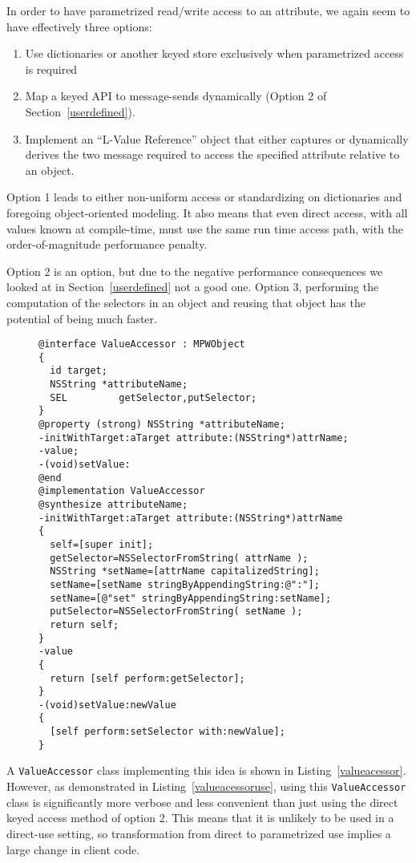 \documentclass[preprint]{sigplanconf}
\begin{document}
In order to have parametrized read/write access to an attribute, we again seem to have effectively
three options:

\begin{enumerate}
\item Use dictionaries or another keyed store exclusively when parametrized access is required
\item Map a keyed API to message-sends dynamically (Option 2 of Section~\ref{userdefined}).
\item Implement an ``L-Value Reference'' object that either captures or dynamically derives 
	the two message required to access the specified attribute relative to an object.
\end{enumerate}


Option 1 leads to either non-uniform access or standardizing on dictionaries and foregoing 
object-oriented modeling.   It also means that even direct access, with all values known
at compile-time, must use the same run time access path, with the order-of-magnitude
performance penalty.
 
Option 2 is an option, but due to the negative performance
consequences we looked at in
Section~\ref{userdefined} not a good one.   Option 3,  performing the computation of the selectors
in an object and reusing that object has the potential of being much faster. 

\begin{figure}[htbp]
\begin{lstlisting}[style=numbers,label=valueacessor,caption=Class encapsulating message-based attribute access.]
@interface ValueAccessor : MPWObject
{
  id target;
  NSString *attributeName;
  SEL         getSelector,putSelector;
}
@property (strong) NSString *attributeName;
-initWithTarget:aTarget attribute:(NSString*)attrName;
-value;
-(void)setValue:
@end
@implementation ValueAccessor
@synthesize attributeName;
-initWithTarget:aTarget attribute:(NSString*)attrName
{
  self=[super init];
  getSelector=NSSelectorFromString( attrName );
  NSString *setName=[attrName capitalizedString];
  setName=[setName stringByAppendingString:@":"];
  setName=[@"set" stringByAppendingString:setName];
  putSelector=NSSelectorFromString( setName );
  return self;
}
-value
{
  return [self perform:getSelector];
}
-(void)setValue:newValue
{
  [self perform:setSelector with:newValue];
}
\end{lstlisting}
\end{figure}

A {\tt ValueAccessor} class implementing this idea is shown in Listing~\ref{valueacessor}.  However, 
as demonstrated in Listing~\ref{valueacessoruse}, using this
{\tt ValueAccessor} class is significantly more verbose and less convenient than just using the 
direct keyed access method of option 2.  This means that it is unlikely to be used in a direct-use
setting, so transformation from direct to parametrized use implies a large change in client code.
\end{document}
